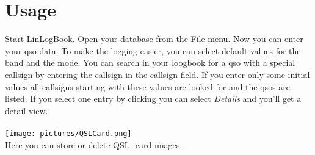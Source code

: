 \documentclass[a4paper,11pt]{article}
\begin{document}
\section{Usage}

Start LinLogBook. Open your database from the File menu. Now you can enter
your qso data. To make the logging easier, you can select default values for the
band and the mode.
You can search in your loogbook for a qso with a special callsign by entering the
callsign in the callsign field. If you enter only some initial values all callsigns
starting with these values are looked for and the qsos are listed. If you select one entry by clicking you can select \textit{Details} and you'll get a detail view.\\ \\
\texttt{[image: pictures/QSLCard.png]}\\
Here  you can store or delete QSL- card images.\\
\end{document}
